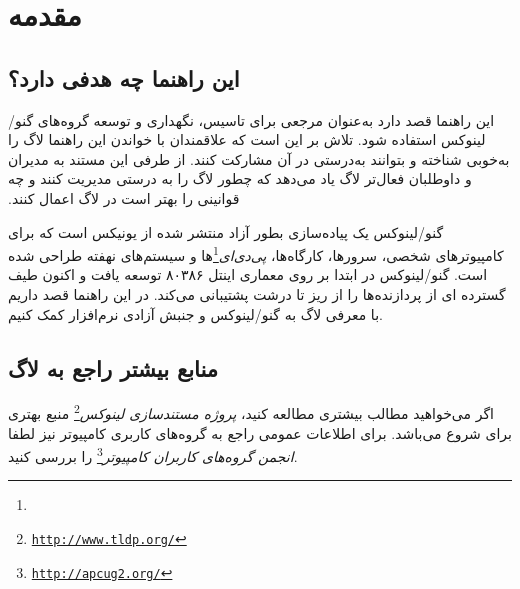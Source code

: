 \section{مقدمه}

\subsection{این راهنما چه هدفی دارد؟}

این راهنما قصد دارد به‌عنوان مرجعی برای تاسیس، نگهداری و توسعه گروه‌های گنو/لینوکس استفاده شود.
تلاش بر این است که علاقمندان با خواندن این راهنما لاگ را ‫به‌خوبی شناخته و بتوانند به‌درستی در آن
مشارکت کنند. از طرفی این مستند به مدیران و داوطلبان فعال‌تر لاگ یاد می‌دهد که چطور لاگ را به درستی
مدیریت کنند و چه قوانینی را بهتر است در لاگ اعمال کنند.

گنو/لینوکس یک پیاده‌سازی بطور آزاد منتشر شده از یونیکس است که برای کامپیوترهای شخصی،
سرورها، کارگاه‌ها،
\emph{پی‌دی‌ای}\footnote{}ها
و سیستم‌های نهفته طراحی شده است.
گنو/لینوکس در ابتدا بر روی معماری اینتل ۸۰۳۸۶ توسعه یافت و اکنون طیف گسترده ای از پردازنده‌ها
را از ریز تا درشت پشتیبانی می‌کند. در این راهنما قصد داریم با معرفی لاگ به گنو/لینوکس و جنبش
آزادی نرم‌افزار کمک کنیم.

%

\subsection{منابع بیشتر راجع به لاگ}

اگر می‌خواهید مطالب بیشتری مطالعه کنید،
\emph{پروژه مستندسازی لینوکس}\footnote{\texttt{\url{http://www.tldp.org/}}}
منبع بهتری برای شروع می‌باشد. برای اطلاعات عمومی راجع به گروه‌های کاربری کامپیوتر نیز لطفا
\emph{انجمن گروه‌های کاربران کامپیوتر}\footnote{\texttt{\url{http://apcug2.org/}}}
را بررسی کنید.


